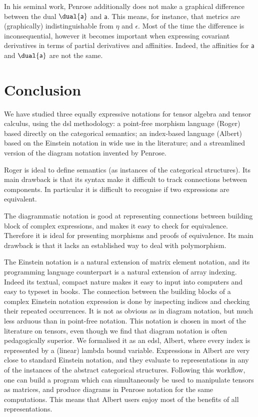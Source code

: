 \documentclass[nolinenum]{jfp}
\begin{document}
In his seminal work, Penrose additionally does not make a graphical
difference between the dual \(\dual{\mathsf{a}}\) and \(\mathsf{a}\). This means, for instance, that metrics
are (graphically) indistinguishable from \(η\) and
\(ϵ\). Most of the time the difference is inconsequential,
however it becomes important when expressing covariant derivatives in
terms of partial derivatives and affinities. Indeed, the affinities
for \(\mathsf{a}\) and \(\dual{\mathsf{a}}\) are not the same.

\section{Conclusion}\label{382} 
We have studied three equally expressive notations for tensor algebra
and tensor calculus, using the {\sc{}dsl} methodology: a point-free morphism
language ({\sc{}Roger}) based directly on the categorical semantics; an
index-based language ({\sc{}Albert}) based on the Einstein notation in wide
use in the literature; and a streamlined version of the diagram
notation invented by Penrose.

{\sc{}Roger} is ideal to define semantics (as instances of the
categorical structures). Its main drawback is that its syntax make it
difficult to track connections between components. In particular it is
difficult to recognise if two expressions are equivalent.

The diagrammatic notation is good at representing connections between
building block of complex expressions, and makes it easy to check for
equivalence.  Therefore it is ideal for presenting morphisms and
proofs of equivalence. Its main drawback is that it lacks an
established way to deal with polymorphism.

The Einstein notation is a natural extension of matrix element
notation, and its programming language counterpart is a natural
extension of array indexing.  Indeed its textual, compact
nature makes it easy to input into computers and easy to typeset in books.
The connection between
the building blocks of a complex Einstein notation expression is done by inspecting
indices and checking their repeated occurrences. It is not as obvious  as in
diagram notation, but much less arduous than in point-free notation.
This notation
is chosen in most of the literature on tensors, even though we find
that diagram notation is often pedagogically superior.
We formalised it as an {\sc{}edsl}, {\sc{}Albert},
where every index is represented by a (linear) lambda bound variable.
Expressions in {\sc{}Albert} are very close to standard Einstein notation, and they evaluate to representations in any of the
instances of the abstract categorical structures.
Following this workflow, one can build a program which can
simultaneously be used to manipulate tensors as matrices, and produce
diagrams in Penrose notation for the same computations. This means
that {\sc{}Albert} users enjoy most of the benefits of all representations.
\end{document}
